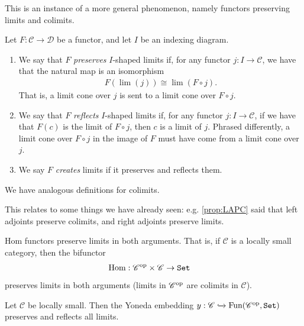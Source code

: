This is an instance of a more general phenomenon, namely functors preserving limits and colimits.

\begin{definition}\label{def:preserve-reflect-create-limits} Let $F:\mathscr{C} \to \mathscr{D}$ be a functor, and let $I$ be an indexing diagram.
\begin{enumerate}
    \item We say that $F$ \textit{preserves} $I$-shaped limits if, for any functor $j: I \to \mathscr{C}$, we have that the natural map is an isomorphism
    \begin{align*}
        F(\lim(j)) \cong \lim(F\circ j).
    \end{align*}
    That is, a limit cone over $j$ is sent to a limit cone over $F\circ j$.

    \item We say that $F$ \textit{reflects} $I$-shaped limits if, for any functor $j: I \to \mathscr{C}$, if we have that $F(c)$ is the limit of $F\circ j$, then $c$ is a limit of $j$. Phrased differently, a limit cone over $F\circ j$ in the image of $F$ must have come from a limit cone over $j$.

    \item We say $F$ \textit{creates} limits if it preserves and reflects them.
\end{enumerate}
We have analogous definitions for colimits.
\end{definition}

This relates to some things we have already seen: e.g. \autoref{prop:LAPC} said that left adjoints preserve colimits, and right adjoints preserve limits.

\begin{proposition}\label{prop:hom-functors-preserve-limits} Hom functors preserve limits in both arguments. That is, if $\mathscr{C}$ is a locally small category, then the bifunctor
\begin{align*}
    \textup{Hom} : \mathscr{C}^{\text{op}} \times \mathscr{C} &\to \texttt{Set}
\end{align*}
preserves limits in both arguments (limits in $\mathscr{C}^{\text{op}}$ are colimits in $\mathscr{C}$).
\end{proposition}


\begin{corollary}\label{cor:Yoneda-embedding-preserves-limits} Let $\mathscr{C}$ be locally small. Then the Yoneda embedding $y: \mathscr{C} \xhookrightarrow{} \text{Fun}(\mathscr{C}^{\text{op}}, \texttt{Set})$ preserves and reflects all limits.
\end{corollary}

